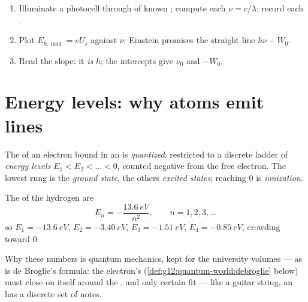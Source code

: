 \begin{method}\label{met:g12:quantum-world:measure-h}
\begin{enumerate}
  \item Illuminate a photocell through  of known ;
        compute each $\nu = c/\lambda$; record each .
  \item Plot $E_{k,\max} = eU_s$ against $\nu$: Einstein promises the
        straight line $h\nu - W_0$.
  \item Read the slope: it \emph{is} $h$; the intercepts give $\nu_0$ and $-W_0$.
\end{enumerate}
\end{method}

\section{Energy levels: why atoms emit lines}

\begin{definition}\label{def:g12:quantum-world:levels}
The  of an electron bound in an  is
\emph{quantized}: restricted to a discrete ladder of
\emph{energy levels} $E_1 < E_2 < \dots < 0$, counted
negative from the free electron. The lowest rung is the \emph{ground
state}, the others \emph{excited
states}; reaching $0$ is
\emph{ionization}.
\end{definition}

\begin{proposition}\label{prop:g12:quantum-world:hydrogen}
The  of the hydrogen  are
\[
E_n = -\frac{\qty{13.6}{eV}}{n^2}, \qquad n = 1, 2, 3, \dots
\]
so $E_1 = \qty{-13.6}{eV}$, $E_2 = \qty{-3.40}{eV}$, $E_3 =
\qty{-1.51}{eV}$, $E_4 = \qty{-0.85}{eV}$, crowding toward $0$.
\end{proposition}
\admitted

\begin{remark}\label{rem:g12:quantum-world:ladder-origin}
Why these numbers is quantum mechanics, kept for the university volumes ---
as is de Broglie's formula: the electron's 
(\cref{def:g12:quantum-world:debroglie} below) must close on itself around
the , and only certain  fit --- like a guitar string, an
 has a discrete set of notes.
\end{remark}

